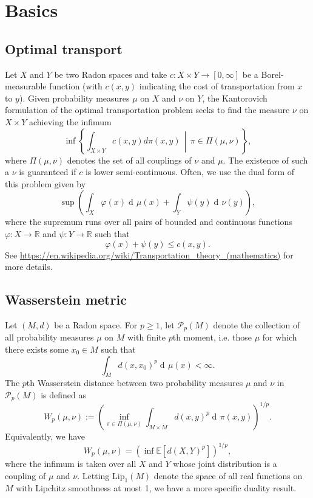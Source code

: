 \documentclass{article}
\newcommand{\dd}{\mathop{\mathrm{d}\!}}
\newcommand{\R}{\mathbb{R}}
\newcommand{\E}{\mathbb{E}}
\newcommand{\Lip}{\mathrm{Lip}}
\renewcommand{\P}{\mathcal{P}}
\begin{document}
\section{Basics}

\subsection{Optimal transport}
Let $X$ and $Y$ be two Radon spaces and take $c:X \times Y \to [0,\infty]$ be a Borel-measurable function (with $c(x,y)$ indicating the cost of transportation from $x$ to $y$). Given probability measures $\mu$ on $X$ and $\nu$ on $Y$, the Kantorovich formulation of the optimal transportation problem seeks to find the measure $\nu$ on $X \times Y$ achieving the infimum
\begin{equation*}
    \inf\left\{\int_{X \times Y} c(x,y) d\pi(x,y) \,\middle|\, \pi \in \Pi(\mu,\nu)\right\},
\end{equation*}
where $\Pi(\mu,\nu)$ denotes the set of all couplings of $\nu$ and $\mu$. The existence of such a $\nu$ is guaranteed if $c$ is lower semi-continuous. Often, we use the dual form of this problem given by
\begin{equation*}
    \sup\left(\int_X \varphi(x) \dd \mu(x) + \int_Y \psi(y) \dd \nu(y)\right),
\end{equation*}
where the supremum runs over all pairs of bounded and continuous functions $\varphi:X \to \R$ and $\psi:Y \to \R$ such that
\begin{equation*}
    \varphi(x) + \psi(y) \leq c(x,y).
\end{equation*}
See \url{https://en.wikipedia.org/wiki/Transportation_theory_(mathematics)} for more details.


\subsection{Wasserstein metric}
Let $(M,d)$ be a Radon space. For $p \geq 1$, let $\P_p(M)$ denote the collection of all probability measures $\mu$ on $M$ with finite $p$th moment, i.e. those $\mu$ for which there exists some $x_0 \in M$ such that
\begin{equation*}
    \int_M d(x,x_0)^p \dd \mu(x) < \infty.
\end{equation*}
The $p$th Wasserstein distance between two probability measures $\mu$ and $\nu$ in $\P_p(M)$ is defined as
\begin{equation*}
    W_p(\mu,\nu) := \left(\inf_{\pi \in \Pi(\mu,\nu)} \int_{M \times M} d(x,y)^p \dd \pi(x,y)\right)^{1/p}.
\end{equation*}
 Equivalently, we have
\begin{equation*}
    W_p(\mu,\nu) = (\inf \E[d(X,Y)^p])^{1/p},
\end{equation*}
where the infimum is taken over all $X$ and $Y$ whose joint distribution is a coupling of $\mu$ and $\nu$. Letting $\Lip_1(M)$ denote the space of all real functions on $M$ with Lipchitz smoothness at most 1, we have a more specific duality result.
\end{document}
